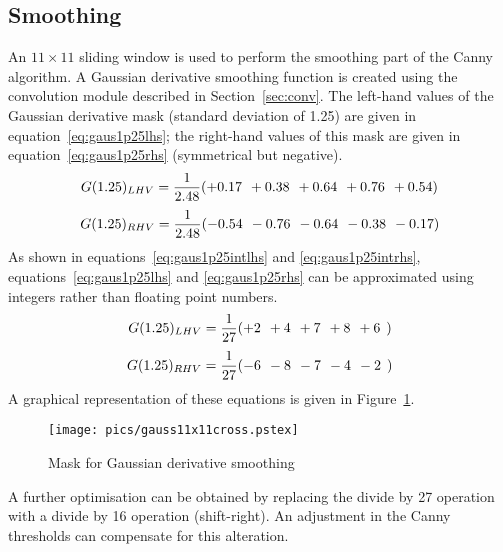 \documentclass[10pt,twocolumn,letterpaper]{article}
\begin{document}
\subsection{Smoothing}
\label{sec:smoothing}
An $11\times 11$ sliding window is used to perform the 
smoothing part of the Canny algorithm.
A Gaussian derivative smoothing function is created using 
the convolution module described in Section~\ref{sec:conv}.
The left-hand values of the Gaussian derivative mask (standard deviation
of 1.25) are given in equation~\ref{eq:gaus1p25lhs}; the right-hand values of
this mask are given in equation~\ref{eq:gaus1p25rhs} (symmetrical but negative).
\begin{equation}
\label{eq:gaus1p25lhs}
G(1.25)_{LHV} = \frac{1}{2.48} (+0.17 \rule{0.15cm}{0cm} +0.38 \rule{0.15cm}{0cm} +0.64 \rule{0.15cm}{0cm} +0.76 \rule{0.15cm}{0cm} +0.54)
\end{equation}
\begin{equation}
\label{eq:gaus1p25rhs}
G(1.25)_{RHV} = \frac{1}{2.48} (-0.54 \rule{0.15cm}{0cm} -0.76 \rule{0.15cm}{0cm} -0.64 \rule{0.15cm}{0cm} -0.38 \rule{0.15cm}{0cm} -0.17)
\end{equation}
As shown in equations~\ref{eq:gaus1p25intlhs} and \ref{eq:gaus1p25intrhs}, equations~\ref{eq:gaus1p25lhs} and \ref{eq:gaus1p25rhs}
can be approximated using integers rather than floating point numbers.
\begin{equation}
\label{eq:gaus1p25intlhs}
G(1.25)_{LHV} = \frac{1}{27} (+2 \rule{0.15cm}{0cm} +4 \rule{0.15cm}{0cm} +7 \rule{0.15cm}{0cm} +8 \rule{0.15cm}{0cm} +6 \rule{0.15cm}{0cm})
\end{equation}
\begin{equation}
\label{eq:gaus1p25intrhs}
G(1.25)_{RHV} = \frac{1}{27} (-6 \rule{0.15cm}{0cm} -8 \rule{0.15cm}{0cm} -7 \rule{0.15cm}{0cm} -4 \rule{0.15cm}{0cm} -2 \rule{0.15cm}{0cm})
\end{equation}
A graphical representation of these equations is given in Figure~\ref{fig:gauss11cross}.
\begin{figure}[!htb]
\begin{center}
\setlength{\abovecaptionskip}{-0.25cm}
        \texttt{[image: pics/gauss11x11cross.pstex]}
        \caption{Mask for Gaussian derivative smoothing}
        \label{fig:gauss11cross}
\setlength{\abovecaptionskip}{0cm}
\end{center}
\end{figure}
A further optimisation can be obtained by replacing the divide by 27 operation with a divide by 16 operation (shift-right).
An adjustment in the Canny thresholds can compensate for this alteration.
\end{document}
